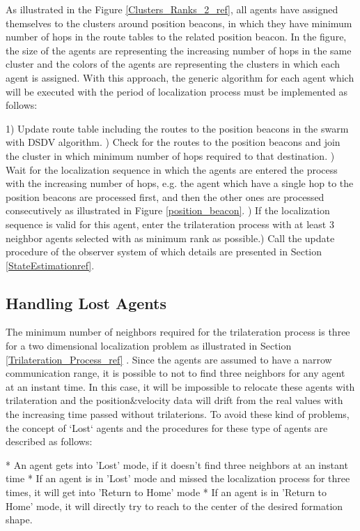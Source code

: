 As illustrated in the Figure \ref{Clusters_Ranks_2_ref}, all agents have assigned themselves to the clusters around position beacons, in which they have minimum number of hops in the route tables to the related position beacon. In the figure, the size of the agents are representing the increasing number of hops in the same cluster and the colors of the agents are representing the clusters in which each agent is assigned. With this approach, the generic algorithm for each agent which will be executed with the period of localization process must be implemented as follows:
	
	1) Update route table including the routes to the position beacons in the swarm with DSDV algorithm. ) Check for the routes to the position beacons and join the cluster in which minimum number of hops required to that destination. ) Wait for the localization sequence in which the agents are entered the process with the increasing number of hops, e.g. the agent which have a single hop to the position beacons are processed first, and then the other ones are processed consecutively as illustrated in Figure \ref{position_beacon}. ) If the localization sequence is valid for this agent, enter the trilateration process with at least 3 neighbor agents selected with as minimum rank as possible.) Call the update procedure of the observer system of which details are presented in Section \ref{StateEstimationref}.
	
\subsection{Handling Lost Agents} \label{LostAgents}
The minimum number of neighbors required for the trilateration process is three for a two dimensional localization problem as illustrated in Section \ref{Trilateration_Process_ref} . Since the agents are assumed to have a narrow communication range, it is possible to not to find three neighbors for any agent at an instant time. In this case, it will be impossible to relocate these agents with trilateration and the position$\&$velocity data will drift from the real values with the increasing time passed without trilaterions. To avoid these kind of problems, the concept of `Lost` agents and the procedures for these type of agents are described as follows:
	
	* An agent gets into 'Lost' mode, if it doesn't find three neighbors at an instant time \newline
	* If an agent is in 'Lost' mode and missed the localization process for three times, it will get into 'Return to Home' mode \newline
	* If an agent is in 'Return to Home' mode, it will directly try to reach to the center of the desired formation shape.
		
